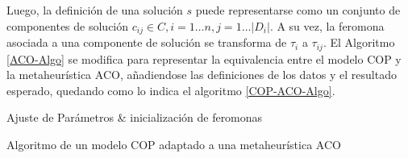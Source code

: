 Luego, la definici\'on de una soluci\'on $s$ puede representarse como un conjunto de componentes de soluci\'on $c_{ij} \in C, i = 1 \dotsc n, j = 1 \dotsc |D_i|$. A su vez, la feromona asociada a una componente de soluci\'on se transforma de $\tau_i$ a $\tau_{ij}$. El Algoritmo  \ref{ACO-Algo} se modifica para representar la equivalencia entre el modelo COP y la metaheur\'istica ACO, a\~nadiendose las definiciones de los datos y el resultado esperado, quedando como lo indica el algoritmo \ref{COP-ACO-Algo}. 


\begin{algorithm}[H]
\SetAlgoLined
{}
 Ajuste de Par\'ametros \& inicializaci\'on de feromonas \;
 \caption{Algoritmo de un modelo COP adaptado a una metaheur\'istica ACO}\label{COP-ACO-Algo}
\end{algorithm}